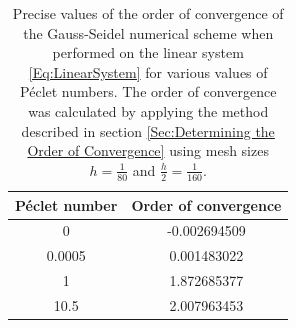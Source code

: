 \documentclass[a4paper,11pt]{article}
\theoremstyle{break}
\theoremstyle{break2}
\theoremstyle{break}
\theoremstyle{break2}
\begin{document}
\begin{table}[h!]
	\centering
	\begin{tabular}{c|c}
		P\'{e}clet number & Order of convergence \\
		\hline 
		0 & -0.002694509 \\
		0.0005 & 0.001483022 \\
		1 & 1.872685377 \\
		10.5 & 2.007963453  
	\end{tabular}
	\caption{Precise values of the order of convergence of the Gauss-Seidel numerical scheme when performed on the linear system \eqref{Eq:LinearSystem} for various values of P\'{e}clet numbers. The order of convergence was calculated by applying the method described in section \ref{Sec:Determining the Order of Convergence} using mesh sizes $ h = \frac{1}{80} $ and $ \frac{h}{2} = \frac{1}{160} $.\label{Tab:OrderofConvergence}}
\end{table}
\end{document}
